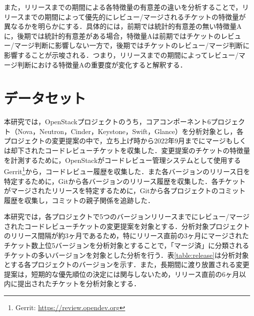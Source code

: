 \documentclass[11pt]{jreport}
\begin{document}
また，リリースまでの期間による各特徴量の有意差の違いを分析することで，リリースまでの期間によって優先的にレビュー/マージされるチケットの特徴量が異なるかを明らかにする．具体的には，前期では統計的有意差の無い特徴量Aに，後期では統計的有意差がある場合，特徴量Aは前期ではチケットのレビュー/マージ判断に影響しない一方で，後期ではチケットのレビュー/マージ判断に影響することが示唆される．つまり，リリースまでの期間によってレビュー/マージ判断における特徴量Aの重要度が変化すると解釈する．


\section{データセット}\label{sec:dataset}
本研究では，OpenStackプロジェクトのうち，コアコンポーネント6プロジェクト（Nova，Neutron，Cinder，Keystone，Swift，Glance）を分析対象とし，各プロジェクトの変更提案の中で，立ち上げ時から2022年9月までにマージもしくは却下されたコードレビューチケットを収集した．変更提案のチケットの特徴量を計測するために，OpenStackがコードレビュー管理システムとして使用するGerrit\footnote{Gerrit: \url{https://review.opendev.org}}から，コードレビュー履歴を収集した．また各バージョンのリリース日を特定するために，Gitから各バージョンのリリース履歴を収集した．各チケットがマージされたリリースを特定するために，Gitから各プロジェクトのコミット履歴を収集し，コミットの親子関係を追跡した．

本研究では，各プロジェクトで5つのバージョンリリースまでにレビュー/マージされたコードレビューチケットの変更提案を対象とする．分析対象プロジェクトのリリース間隔が約3ヶ月であるため，特にリリース直前の3ヶ月にマージされたチケット数上位5バージョンを分析対象とすることで，「マージ済」に分類されるチケットの多いバージョンを対象とした分析を行う．表\ref{table:release}は分析対象とする各プロジェクトのバージョンを示す．また，長期間に渡り放置される変更提案は，短期的な優先順位の決定には関与しないため，リリース直前の6ヶ月以内に提出されたチケットを分析対象とする．
\end{document}
